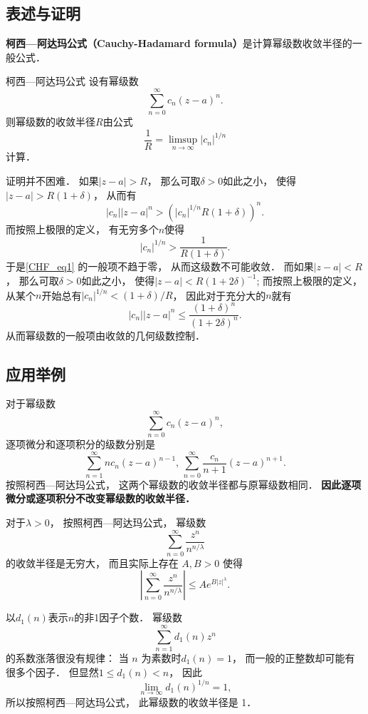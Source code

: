 

\subsection{表述与证明}

\textbf{柯西—阿达玛公式（Cauchy-Hadamard formula）}是计算幂级数收敛半径的一般公式．

\begin{theorem}{柯西—阿达玛公式}
设有幂级数
\begin{equation}\label{CHF_eq1}
\sum_{n=0}^\infty c_n(z-a)^n.
\end{equation}
则幂级数的收敛半径$R$由公式
$$
\frac{1}{R}=\limsup_{n\to\infty}|c_n|^{1/n}
$$
计算．
\end{theorem}
证明并不困难． 如果$|z-a|>R$， 那么可取$\delta>0$如此之小， 使得$|z-a|>R(1+\delta)$， 从而有
$$
|c_n||z-a|^n>(|c_n|^{1/n}R(1+\delta))^n.
$$
而按照上极限的定义， 有无穷多个$n$使得
$$
|c_n|^{1/n}>\frac{1}{R(1+\delta)}.
$$
于是\autoref{CHF_eq1} 的一般项不趋于零， 从而这级数不可能收敛． 而如果$|z-a|<R$， 那么可取$\delta>0$如此之小， 使得$|z-a|<R(1+2\delta)^{-1}$; 而按照上极限的定义， 从某个$n$开始总有$|c_n|^{1/n}<(1+\delta)/R$， 因此对于充分大的$n$就有
$$
|c_n||z-a|^n\leq\frac{(1+\delta)^n}{(1+2\delta)^n}.
$$
从而幂级数的一般项由收敛的几何级数控制．

\subsection{应用举例}
对于幂级数
$$
\sum_{n=0}^\infty c_n(z-a)^n,
$$
逐项微分和逐项积分的级数分别是
$$
\sum_{n=1}^\infty nc_n(z-a)^{n-1},\,
\sum_{n=0}^\infty \frac{c_n}{n+1}(z-a)^{n+1}.
$$
按照柯西—阿达玛公式， 这两个幂级数的收敛半径都与原幂级数相同． \textbf{因此逐项微分或逐项积分不改变幂级数的收敛半径．}

对于$\lambda>0$， 按照柯西—阿达玛公式， 幂级数
$$
\sum_{n=0}^\infty\frac{z^n}{n^{n/\lambda}}
$$
的收敛半径是无穷大， 而且实际上存在 $A,B>0$ 使得
$$
\left|\sum_{n=0}^\infty\frac{z^n}{n^{n/\lambda}}\right|
\leq Ae^{B|z|^\lambda}.
$$

以$d_1(n)$表示$n$的非1因子个数． 幂级数
$$
\sum_{n=1}^\infty d_1(n)z^n
$$
的系数涨落很没有规律： 当 $n$ 为素数时$d_1(n)=1$， 而一般的正整数却可能有很多个因子． 但显然$1\leq d_1(n)<n$， 因此
$$
\lim_{n\to\infty}d_1(n)^{1/n}=1,
$$
所以按照柯西—阿达玛公式， 此幂级数的收敛半径是 1．